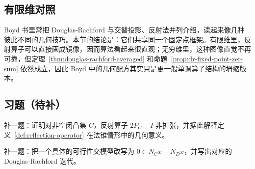 \subsection*{有限维对照}

Boyd 书里常把 Douglas-Rachford 与交替投影、反射法并列介绍，读起来像几种彼此不同的几何技巧。本节的结论是：它们共享同一个固定点框架。有限维里，反射算子可以直接画成镜像，因而算法看起来很直观；无穷维里，这种图像直觉不再可靠，但定理~\ref{thm:douglas-rachford-averaged} 和命题~\ref{prop:dr-fixed-point-zer-sum} 依然成立，因此 Boyd 中的几何配方其实只是更一般单调算子结构的坍缩版本。

\subsection*{习题（待补）}

\begin{exercise}[反射算子占位]
补一题：证明对非空闭凸集 $C$，反射算子 $2P_C-I$ 非扩张，并据此解释定义~\ref{def:reflection-operator} 在法锥情形中的几何意义。
\end{exercise}

\begin{exercise}[可行性交桥接题占位]
补一题：把一个具体的可行性交模型改写为 $0\in N_Cx+N_Dx$，并写出对应的 Douglas-Rachford 迭代。
\end{exercise}
